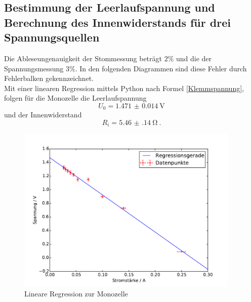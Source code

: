 \subsection{Bestimmung der Leerlaufspannung und Berechnung des Innenwiderstands für drei Spannungsquellen}
Die Ableseungenauigkeit der Stommessung beträgt $2 \% $ und die der Spannungsmessung $3 \% $. In den folgenden Diagrammen sind diese Fehler durch Fehlerbalken gekennzeichnet. \\
Mit einer linearen Regression mittels Python nach Formel \eqref{Klemmspannung}, folgen für die Monozelle die Leerlaufspannung
\[U_0 = \SI{1.471(14)}{\volt}\]
und der Innenwiderstand
\[\label{Innenwiderstand_Monozelle}
R_i = \SI{5.46(14)}{\ohm} \ .\]
\begin{figure}[h!]
	\centering
	\includegraphics[width=0.95\textwidth]{Spannung_Messung_b.pdf}
	\caption{Lineare Regression zur Monozelle}
	\label{fig:Regression_Monozelle}
\end{figure}



